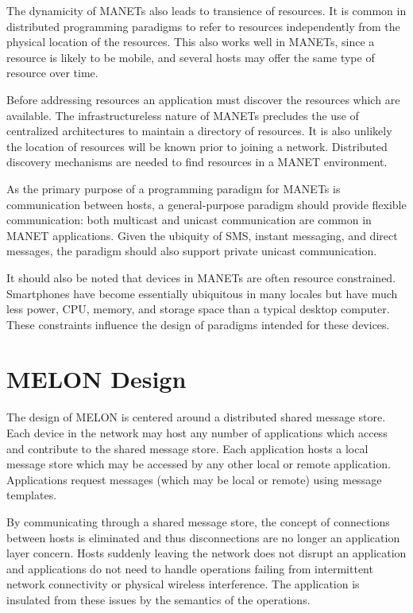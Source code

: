 \documentclass[lnicst]{svmultln}
\begin{document}
The dynamicity of MANETs also leads to transience of resources. It is common in distributed programming paradigms to refer to resources independently from the physical location of the resources. This also works well in MANETs, since a resource is likely to be mobile, and several hosts may offer the same type of resource over time.

Before addressing resources an application must discover the resources which are available. The infrastructureless nature of MANETs precludes the use of centralized architectures to maintain a directory of resources. It is also unlikely the location of resources will be known prior to joining a network. Distributed discovery mechanisms are needed to find resources in a MANET environment.

As the primary purpose of a programming paradigm for MANETs is communication between hosts, a general-purpose paradigm should provide flexible communication: both multicast and unicast communication are common in MANET applications. Given the ubiquity of SMS, instant messaging, and direct messages, the paradigm should also support private unicast communication.

It should also be noted that devices in MANETs are often resource constrained. Smartphones have become essentially ubiquitous in many locales but have much less power, CPU, memory, and storage space than a typical desktop computer. These constraints influence the design of paradigms intended for these devices.

\section{MELON Design}\label{sec:design}

The design of MELON is centered around a distributed shared message store. Each device in the network may host any number of applications which access and contribute to the shared message store. Each application hosts a local message store which may be accessed by any other local or remote application. Applications request messages (which may be local or remote) using message templates.

By communicating through a shared message store, the concept of connections between hosts is eliminated and thus disconnections are no longer an application layer concern. Hosts suddenly leaving the network does not disrupt an application and applications do not need to handle operations failing from intermittent network connectivity or physical wireless interference. The application is insulated from these issues by the semantics of the operations.
\end{document}
